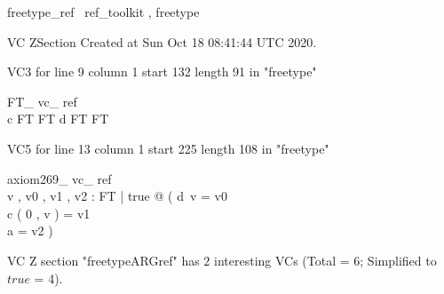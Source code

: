 \documentclass{article}
\begin{document}

\begin{zsection}	 \SECTION freetype\_ref \parents~ref\_toolkit , freetype
\end{zsection}

VC ZSection Created at Sun Oct 18 08:41:44 UTC 2020.

VC3 for line 9 column 1 start 132 length 91 in "freetype"
\begin{theorem}{ FT\_ vc\_ ref}\\
 c \in \nat \cross FT \inj FT \land d \in FT \inj FT \\

\end{theorem}

VC5 for line 13 column 1 start 225 length 108 in "freetype"
\begin{theorem}{ axiom269\_ vc\_ ref}\\
 \exists v , v0 , v1 , v2 : FT | true @ ( d~v = v0 \\
 c ( 0 , v ) = v1 \\
 a = v2 ) \\

\end{theorem}



 VC Z section "freetypeARGref" has $2$ interesting VCs (Total = 6; Simplified to $true$ = 4).



\end{document}
